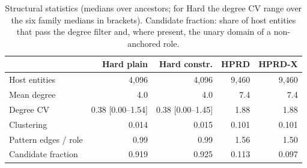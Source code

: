 \begin{table}[t]
\caption{Structural statistics (medians over ancestors; for Hard the degree CV range over the six family medians in brackets). Candidate fraction: share of host entities that pass the degree filter and, where present, the unary domain of a non-anchored role.}
\label{tab:repr}
\centering\footnotesize
\setlength{\tabcolsep}{3pt}
\begin{tabular}{lrrrr}
\toprule
 & Hard plain & Hard constr. & HPRD & HPRD-X\\
\midrule
Host entities & 4,096 & 4,096 & 9,460 & 9,460\\
Mean degree & 4.0 & 4.0 & 7.4 & 7.4\\
Degree CV & 0.38 [0.00--1.54] & 0.38 [0.00--1.45] & 1.88 & 1.88\\
Clustering & 0.014 & 0.015 & 0.101 & 0.101\\
Pattern edges / role & 0.99 & 0.99 & 1.56 & 1.50\\
Candidate fraction & 0.919 & 0.925 & 0.113 & 0.097\\
\bottomrule
\end{tabular}
\end{table}
